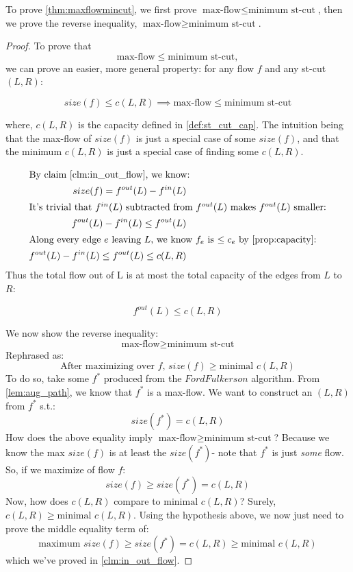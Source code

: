 \documentclass{article}
\theoremstyle{definition}
\begin{document}
To prove \ref{thm:maxflowmincut}, we first prove $\text{max-flow} \leq \text{minimum st-cut}$, then we prove the reverse inequality, $\text{max-flow} \geq \text{minimum st-cut}$.

\begin{proof}
	To prove that $$\text{max-flow} \leq \text{minimum st-cut},$$ we can prove an easier, more general property: for any flow $f$ and any st-cut $(L,R)$:
	
	$$size(f) \leq c(L,R) \implies \text{max-flow} \leq \text{minimum st-cut}$$
	
	where, $c(L,R)$ is the capacity defined in \ref{def:st_cut_cap}. The intuition being that the max-flow of $size(f)$ is just a special case of some $size(f)$, and that the minimum $c(L,R)$ is just a special case of finding some $c(L,R)$.
	
	\begin{align*}
		\shortintertext{By claim \ref{clm:in_out_flow}, we know:}
		size(f) = f^{out} (L) - f^{in} (L)\\
		\shortintertext{It's trivial that $f^{in}(L)$ subtracted from $f^{out}(L)$ makes $f^{out}(L)$ smaller:}
		f^{out} (L) - f^{in} (L) \leq f^{out}(L)\\
		\shortintertext{Along every edge $e$ leaving $L$, we know $f_e$ is $\leq c_e$ by \ref{prop:capacity}:} 
		f^{out} (L) - f^{in} (L) \leq f^{out}(L) \leq c(L,R)
	\end{align*}
	Thus the total flow out of L is at most the total capacity of the edges from $L$ to $R$:

	$$f^{out}(L) \leq c(L,R)$$

	We now show the reverse inequality:
	$$\text{max-flow} \geq \text{minimum st-cut}$$
	Rephrased as:
	$$\text{After maximizing over $f$, } size(f) \geq \text{minimal }c(L,R)$$
	To do so, take some $f^*$ produced from the $FordFulkerson$ algorithm. From \ref{lem:aug_path}, we know that $f^*$ is a max-flow. We want to construct an $(L,R)$ from $f^*$ s.t.:
	$$size(f^*) = c(L,R)$$
	How does the above equality imply $\text{max-flow} \geq \text{minimum st-cut}$? Because we know the max $size(f)$ is at least the $size(f^*)$- note that $f^*$ is just \textit{some} flow. 
	So, if we maximize of flow $f$:
	$$size(f) \geq size(f^*) = c(L,R)$$
	Now, how does $c(L,R)$ compare to $\text{minimal }c(L,R)$? Surely, $c(L,R) \geq \text{minimal }c(L,R)$.
	Using the hypothesis above, we now just need to prove the middle equality term of:
	$$\text{maximum } size(f) \geq size(f^*) = c(L,R) \geq \text{minimal }c(L,R)$$
	which we've proved in \ref{clm:in_out_flow}.
\end{proof}
\end{document}
